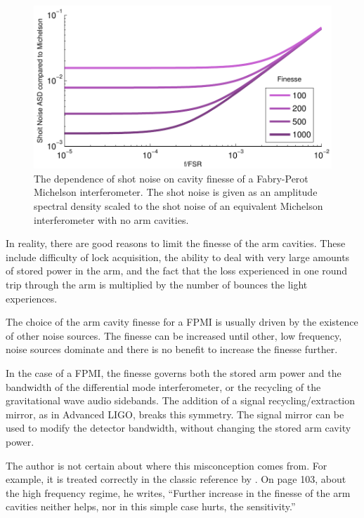 \begin{figure}
  \begin{center}
  \leavevmode
  \includegraphics{figs-ap-miscon/fpmishotnoise.pdf}
  \end{center}
  \caption[The dependence of shot noise on cavity finesse of a Fabry-Perot Michelson interferometer.]{The dependence of shot noise on cavity finesse of a Fabry-Perot Michelson interferometer. The shot noise is given as an amplitude spectral density scaled to the shot noise of an equivalent Michelson interferometer with no arm cavities.}
  \label{fig:fpmishotnoise}
\end{figure}

In reality, there are good reasons to limit the finesse of the arm cavities. %
These include difficulty of lock acquisition, the ability to deal with very large amounts of stored power in the arm, and the fact that the loss experienced in one round trip through the arm is multiplied by the number of bounces the light experiences.

The choice of the arm cavity finesse for a FPMI is usually driven by the existence of other noise sources. %
The finesse can be increased until other, low frequency, noise sources dominate and there is no benefit to increase the finesse further.

In the case of a FPMI, the finesse governs both the stored arm power and the bandwidth of the differential mode interferometer, or the recycling of the gravitational wave audio sidebands. %
The addition of a signal recycling/extraction mirror, as in Advanced LIGO, breaks this symmetry. %
The signal mirror can be used to modify the detector bandwidth, without changing the stored arm cavity power.

The author is not certain about where this misconception comes from. %
For example, it is treated correctly in the classic reference by \citet{saulson1994fundamentals}. %
On page 103, about the high frequency regime, he writes, ``Further increase in the finesse of the arm cavities neither helps, nor in this simple case hurts, the sensitivity.''

